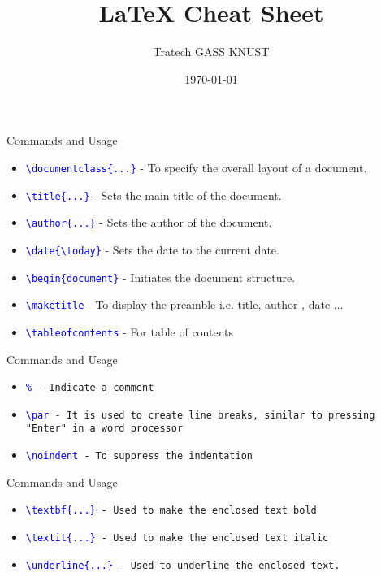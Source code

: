 \documentclass{beamer}
\title{LaTeX Cheat Sheet}
\author{Tratech GASS KNUST}
\date{\today}
\begin{document}
	
	\begin{frame}
		\titlepage
	\end{frame}
	
	\begin{frame}{ Commands and Usage}
		\begin{itemize}
			\item \texttt{\textcolor{blue}{\textbackslash documentclass\{...\}}} - To specify the overall layout of a document.
			\item \texttt{\textcolor{blue}{\textbackslash title\{...\}}} - Sets the main title of the document.
			\item \texttt{\textcolor{blue}{\textbackslash author\{...\}}} - Sets the author of the document.
			\item \texttt{\textcolor{blue}{\textbackslash date\{\textbackslash today\}}} - Sets the date to the current date.
			\item \texttt{\textcolor{blue}{\textbackslash begin\{document\}}} - Initiates the document structure.
			\item \texttt{\textcolor{blue}{\textbackslash maketitle}} - To display the preamble i.e. title, author , date ...
			\item \texttt{\textcolor{blue}{\textbackslash tableofcontents}} - For table of contents
		\end{itemize}
		
	\end{frame}
	
	\begin{frame}{ Commands and Usage}
		\begin{itemize}
			\item \texttt{\textcolor{blue}{\%} - Indicate a comment}
			\item \texttt{\textcolor{blue}{\textbackslash par} -  It is used to create line breaks, similar to pressing "Enter" in a word processor}
			\item \texttt{\textcolor{blue}{\textbackslash noindent} - To suppress the indentation}
		\end{itemize}
	\end{frame}

	\begin{frame}{ Commands and Usage}
		\begin{itemize}
			\item \texttt{\textcolor{blue}{\textbackslash textbf\{...\}} - Used to make the enclosed text bold}
			\item \texttt{\textcolor{blue}{\textbackslash textit\{...\}} - Used to make the enclosed text italic}
			\item \texttt{\textcolor{blue}{\textbackslash underline\{...\}} -  Used to underline the enclosed text.}
		\end{itemize}
	\end{frame}
\end{document}
